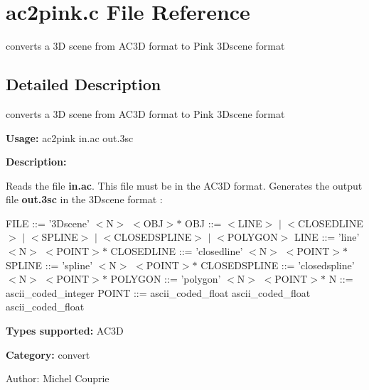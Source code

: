 \section{ac2pink.c File Reference}
\label{ac2pink_8c}
converts a 3D scene from AC3D format to Pink 3Dscene format 



\subsection{Detailed Description}
converts a 3D scene from AC3D format to Pink 3Dscene format 

{\bf Usage:} ac2pink in.ac out.3sc

{\bf Description:}

Reads the file {\bf in.ac}. This file must be in the AC3D format. Generates the output file {\bf out.3sc} in the 3Dscene format :

FILE ::= '3Dscene' $<$N$>$ $<$OBJ$>$$\ast$ OBJ ::= $<$LINE$>$ $|$ $<$CLOSEDLINE$>$ $|$ $<$SPLINE$>$ $|$ $<$CLOSEDSPLINE$>$ $|$ $<$POLYGON$>$ LINE ::= 'line' $<$N$>$ $<$POINT$>$$\ast$ CLOSEDLINE ::= 'closedline' $<$N$>$ $<$POINT$>$$\ast$ SPLINE ::= 'spline' $<$N$>$ $<$POINT$>$$\ast$ CLOSEDSPLINE ::= 'closedspline' $<$N$>$ $<$POINT$>$$\ast$ POLYGON ::= 'polygon' $<$N$>$ $<$POINT$>$$\ast$ N ::= ascii\_\-coded\_\-integer POINT ::= ascii\_\-coded\_\-float ascii\_\-coded\_\-float ascii\_\-coded\_\-float

{\bf Types supported:} AC3D

{\bf Category:} convert

\begin{Desc}
\item[Author:]Michel Couprie \end{Desc}
